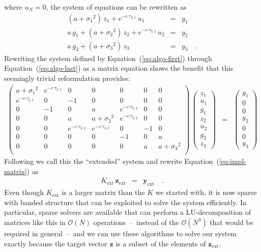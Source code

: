 \documentclass[manuscript, letterpaper]{aastex6}
\renewcommand{\eqref}[1]{\ref{eq:#1}}
\newcommand{\Eq}[1]{Equation~(\eqref{#1})}
\newcommand{\eq}[1]{\Eq{#1}}
\newcommand{\eqlabel}[1]{\label{eq:#1}}
\newcommand{\bvec}[1]{{\ensuremath{\boldsymbol{#1}}}}
\begin{document}
where $u_{N} = 0$,
the system of equations can be rewritten as
\begin{eqnarray}
(a+{\sigma_1}^2)\,z_1 + e^{-c\,\tau_{2,1}}\,u_1 &=& y_1 \\
a\,g_1 + (a+{\sigma_2}^2)\,z_2 + e^{-c\,\tau_{3,2}}\,u_2 &=& y_2 \\
a\,g_2 + (a+{\sigma_3}^2)\,z_3 &=& y_3 \quad. \eqlabel{algo-last}
\end{eqnarray}
Rewriting the system defined by \eq{algo-first} through \eq{algo-last}
as a matrix equation shows the benefit that this seemingly trivial
reformulation provides:
\begin{eqnarray}
\begin{pmatrix}
    a+{\sigma_1}^2 & e^{-c\,\tau_{2,1}} & 0 & 0 & 0 & 0 & 0 \\
    e^{-c\,\tau_{2,1}} & 0 & -1 & 0 & 0 & 0 & 0 \\
    0 & -1 & 0 & a & e^{-c\,\tau_{3,2}} & 0 & 0 \\
    0 & 0 & a & a+{\sigma_2}^2 & e^{-c\,\tau_{3,2}} & 0 & 0 \\
    0 & 0 & e^{-c\,\tau_{3,2}} & e^{-c\,\tau_{3,2}} & 0 & -1 & 0 \\
    0 & 0 & 0 & 0 & -1 & 0 & a \\
    0 & 0 & 0 & 0 & 0 & a & a+{\sigma_3}^2 \\
\end{pmatrix}\,
\begin{pmatrix}
    z_1 \\ u_1 \\ g_1 \\ z_2 \\ u_2 \\ g_2 \\ z_3
\end{pmatrix} &=&
\begin{pmatrix}
    y_1 \\ 0 \\ 0 \\ y_2 \\ 0 \\ 0 \\ y_3
\end{pmatrix}\nonumber
\end{eqnarray}
Following \citet{Ambikasaran:2015} we call this the ``extended'' system and
rewrite \eq{impl-matrix} as
\begin{eqnarray}
    K_\mathrm{ext}\,\bvec{z}_\mathrm{ext} &=& \bvec{y}_\mathrm{ext} \quad.
\end{eqnarray}
Even though $K_\mathrm{ext}$ is a larger matrix than the $K$ we started
with, it is now sparse with banded structure that can be exploited to solve
the system efficiently.
In particular, sparse solvers are available that can perform a
LU-decomposition of matrices like this in $\mathcal{O}(N)$
operations~--~instead of the $\mathcal{O}(N^3)$ that would be required in
general~--~and we can use these algorithms to solve our system
exactly because the target vector $\bvec{z}$ is a subset of the elements of
$\bvec{z}_\mathrm{ext}$.
\end{document}
